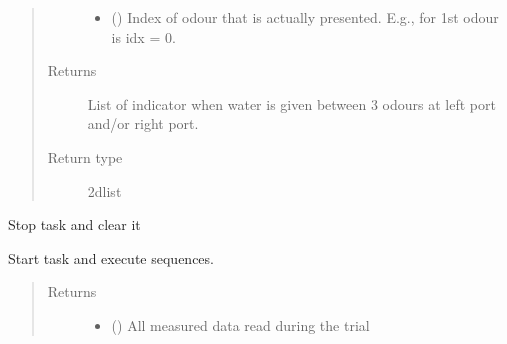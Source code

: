 \documentclass[letterpaper,10pt,english]{sphinxmanual}
\begin{document}
\begin{fulllineitems}
\begin{fulllineitems}
\begin{quote}
\begin{description}
\begin{itemize}
\item {} 
\sphinxAtStartPar
{} () \textendash{} Index of odour that is actually presented. E.g., for 1st odour is
idx = 0.

\end{itemize}

\item[{Returns}] \leavevmode
\sphinxAtStartPar
{} \textendash{} List of indicator when water is given between 3 odours at left port
and/or right port.

\item[{Return type}] \leavevmode
\sphinxAtStartPar
2d\sphinxhyphen{}list

\end{description}\end{quote}

\end{fulllineitems}


\begin{fulllineitems}
\label{\detokenize{NoSeMazeController/daqface:daqface.DAQ.DoAiConcatenatedWaitTrainingMultiTask.ClearTasks}}
\pysigstartsignatures
{}
\pysigstopsignatures
\sphinxAtStartPar
Stop task and clear it

\end{fulllineitems}


\begin{fulllineitems}
\label{\detokenize{NoSeMazeController/daqface:daqface.DAQ.DoAiConcatenatedWaitTrainingMultiTask.DoTask}}
\pysigstartsignatures
{}
\pysigstopsignatures
\sphinxAtStartPar
Start task and execute sequences.
\begin{quote}\begin{description}
\item[{Returns}] \leavevmode
\sphinxAtStartPar
\begin{itemize}
\item {} 
\sphinxAtStartPar
{} () \textendash{} All measured data read during the trial


\end{itemize}
\end{description}
\end{quote}
\end{fulllineitems}
\end{fulllineitems}
\end{document}
